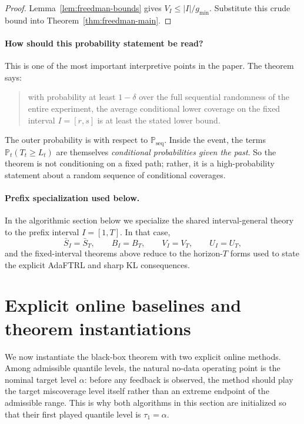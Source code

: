 \documentclass[11pt]{article}
\newcommand{\Prob}{\mathbb{P}}
\newcommand{\1}{\mathbf{1}}
\newcommand{\seq}{\mathrm{seq}}
\begin{document}
\begin{proof}
Lemma~\ref{lem:freedman-bounds} gives $V_I\le |I|/g_{\min}$. Substitute this crude bound into Theorem~\ref{thm:freedman-main}.
\end{proof}

\paragraph{How should this probability statement be read?}
This is one of the most important interpretive points in the paper. The theorem says:
\begin{quote}
with probability at least $1-\delta$ over the full sequential randomness of the entire experiment, the average conditional lower coverage on the fixed interval $I=[r,s]$ is at least the stated lower bound.
\end{quote}

The outer probability is with respect to $\Prob_{\seq}$. Inside the event, the terms $\Prob_t(T_t\ge L_t)$ are themselves \emph{conditional probabilities given the past}. So the theorem is not conditioning on a fixed path; rather, it is a high-probability statement about a random sequence of conditional coverages.

\paragraph{Prefix specialization used below.}
In the algorithmic section below we specialize the shared interval-general theory to the prefix interval $I=[1,T]$. In that case,
\[
\bar S_I=\bar S_T,
\qquad
B_I=B_T,
\qquad
V_I=V_T,
\qquad
U_I=U_T,
\]
and the fixed-interval theorems above reduce to the horizon-$T$ forms used to state the explicit AdaFTRL and sharp KL consequences.

\section{Explicit online baselines and theorem instantiations}
\label{sec:adaftrl}

We now instantiate the black-box theorem with two explicit online methods. Among admissible quantile levels, the natural no-data operating point is the nominal target level $\alpha$: before any feedback is observed, the method should play the target miscoverage level itself rather than an extreme endpoint of the admissible range. This is why both algorithms in this section are initialized so that their first played quantile level is $\tau_1=\alpha$.
\end{document}
